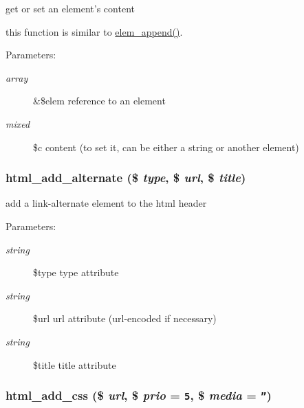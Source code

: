 get or set an element's content

this function is similar to \hyperlink{html_8inc_8php_ea37c451f5d55e2efbb2656e340c1dae}{elem\_\-append()}. \begin{Desc}
\item[Parameters:]
\begin{description}
\item[{\em array}]\&\$elem reference to an element \item[{\em mixed}]\$c content (to set it, can be either a string or another element) \end{description}
\end{Desc}
\hypertarget{html_8inc_8php_e013e8f0bdd681184ee1873a1964c454}{
\subsubsection[{html\_\-add\_\-alternate}]{\setlength{\rightskip}{0pt plus 5cm}html\_\-add\_\-alternate (\$ {\em type}, \/  \$ {\em url}, \/  \$ {\em title})}}
\label{html_8inc_8php_e013e8f0bdd681184ee1873a1964c454}


add a link-alternate element to the html header

\begin{Desc}
\item[Parameters:]
\begin{description}
\item[{\em string}]\$type type attribute \item[{\em string}]\$url url attribute (url-encoded if necessary) \item[{\em string}]\$title title attribute \end{description}
\end{Desc}
\hypertarget{html_8inc_8php_962ef1b29e909a38b9a7b79086d54ab2}{
\subsubsection[{html\_\-add\_\-css}]{\setlength{\rightskip}{0pt plus 5cm}html\_\-add\_\-css (\$ {\em url}, \/  \$ {\em prio} = {\tt 5}, \/  \$ {\em media} = {\tt ''})}}
\label{html_8inc_8php_962ef1b29e909a38b9a7b79086d54ab2}


